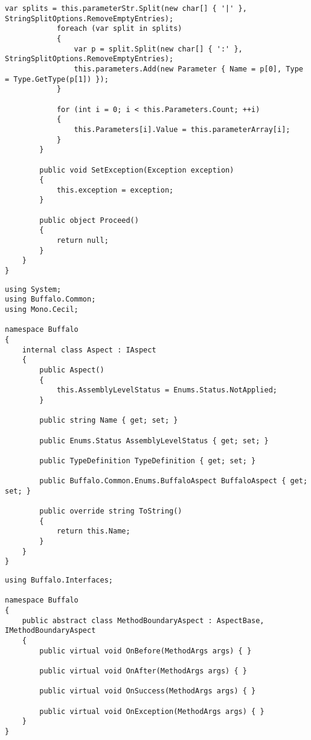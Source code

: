 \begin{lstlisting}[caption={../buffalo/MethodArgs.cs}, label=../buffalo/MethodArgs.cs, frame=tb, basicstyle=\scriptsize]
            var splits = this.parameterStr.Split(new char[] { '|' }, StringSplitOptions.RemoveEmptyEntries);
            foreach (var split in splits)
            {
                var p = split.Split(new char[] { ':' }, StringSplitOptions.RemoveEmptyEntries);
                this.parameters.Add(new Parameter { Name = p[0], Type = Type.GetType(p[1]) });
            }

            for (int i = 0; i < this.Parameters.Count; ++i)
            {
                this.Parameters[i].Value = this.parameterArray[i];
            }
        }

        public void SetException(Exception exception)
        {
            this.exception = exception;
        }

        public object Proceed()
        {
            return null;
        }
    }
}
\end{lstlisting}

\begin{lstlisting}[caption={../buffalo/Aspect.cs}, label=../buffalo/Aspect.cs, frame=tb, basicstyle=\scriptsize]﻿using System;
using Buffalo.Common;
using Mono.Cecil;

namespace Buffalo
{
    internal class Aspect : IAspect
    {
        public Aspect()
        {
            this.AssemblyLevelStatus = Enums.Status.NotApplied;
        }

        public string Name { get; set; }

        public Enums.Status AssemblyLevelStatus { get; set; }

        public TypeDefinition TypeDefinition { get; set; }

        public Buffalo.Common.Enums.BuffaloAspect BuffaloAspect { get; set; }

        public override string ToString()
        {
            return this.Name;
        }
    }
}
\end{lstlisting}

\begin{lstlisting}[caption={../buffalo/MethodBoundaryAspect.cs}, label=../buffalo/MethodBoundaryAspect.cs, frame=tb, basicstyle=\scriptsize]﻿using Buffalo.Interfaces;

namespace Buffalo
{
    public abstract class MethodBoundaryAspect : AspectBase, IMethodBoundaryAspect
    {
        public virtual void OnBefore(MethodArgs args) { }

        public virtual void OnAfter(MethodArgs args) { }

        public virtual void OnSuccess(MethodArgs args) { }

        public virtual void OnException(MethodArgs args) { }
    }
}
\end{lstlisting}

